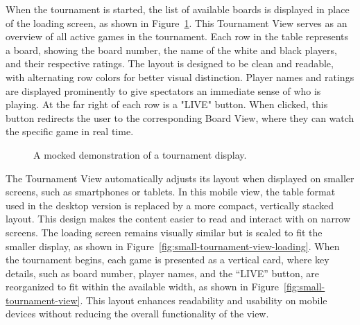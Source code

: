 When the tournament is started, the list of available boards is displayed in place of the loading screen, as shown in Figure~\ref{fig:tournament-view-mocked}. This Tournament View serves as an overview of all active games in the tournament. Each row in the table represents a board, showing the board number, the name of the white and black players, and their respective ratings. The layout is designed to be clean and readable, with alternating row colors for better visual distinction. Player names and ratings are displayed prominently to give spectators an immediate sense of who is playing. At the far right of each row is a "LIVE" button. When clicked, this button redirects the user to the corresponding Board View, where they can watch the specific game in real time. \\

\begin{figure}[h!] \centering {}\caption[Display of tournament]{A mocked demonstration of a tournament display.}\label{fig:tournament-view-mocked} \end{figure}

The Tournament View automatically adjusts its layout when displayed on smaller screens, such as smartphones or tablets. In this mobile view, the table format used in the desktop version is replaced by a more compact, vertically stacked layout. This design makes the content easier to read and interact with on narrow screens. The loading screen remains visually similar but is scaled to fit the smaller display, as shown in Figure~\ref{fig:small-tournament-view-loading}. When the tournament begins, each game is presented as a vertical card, where key details, such as board number, player names, and the “LIVE” button, are reorganized to fit within the available width, as shown in Figure~\ref{fig:small-tournament-view}. This layout enhances readability and usability on mobile devices without reducing the overall functionality of the view. \\


